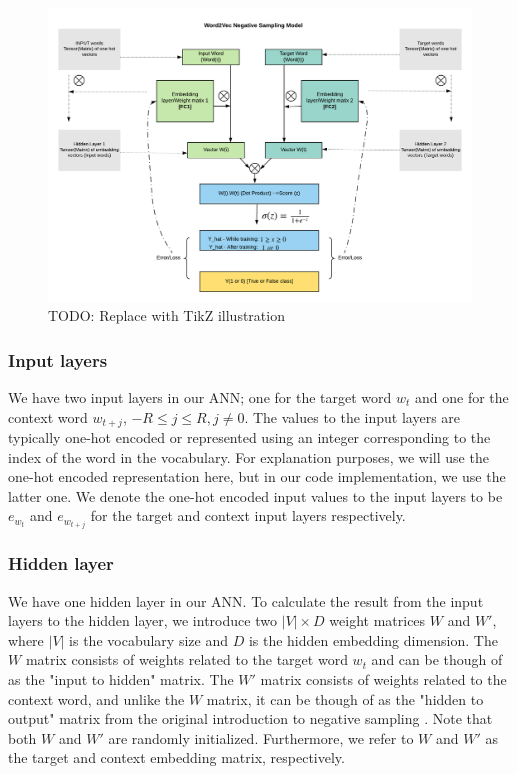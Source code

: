 \begin{figure}[ht]
    \centering
    \includegraphics[width=15cm]{thesis/figures/word2vec-skip-gram-negative-sampling.png}
    \caption{TODO: Replace with TikZ illustration}
    \label{fig:word2vec-skip-gram-negative-sampling}
\end{figure}

\subsubsection{Input layers}
We have two input layers in our ANN; one for the target word $w_t$ and one for the context word $w_{t+j}$, $-R \leq j \leq R, j \neq 0$. The values to the input layers are typically one-hot encoded or represented using an integer corresponding to the index of the word in the vocabulary. For explanation purposes, we will use the one-hot encoded representation here, but in our code implementation, we use the latter one. We denote the one-hot encoded input values to the input layers to be $e_{w_t}$ and $e_{w_{t+j}}$ for the target and context input layers respectively.

\subsubsection{Hidden layer}
We have one hidden layer in our ANN. To calculate the result from the input layers to the hidden layer, we introduce two $|V| \times D$ weight matrices $W$ and $W'$, where $|V|$ is the vocabulary size and $D$ is the hidden embedding dimension. The $W$ matrix consists of weights related to the target word $w_t$ and can be though of as the "input to hidden" matrix. The $W'$ matrix consists of weights related to the context word, and unlike the $W$ matrix, it can be though of as the "hidden to output" matrix from the original introduction to negative sampling \cite{mikolov2013b}. Note that both $W$ and $W'$ are randomly initialized. Furthermore, we refer to $W$ and $W'$ as the target and context embedding matrix, respectively.


